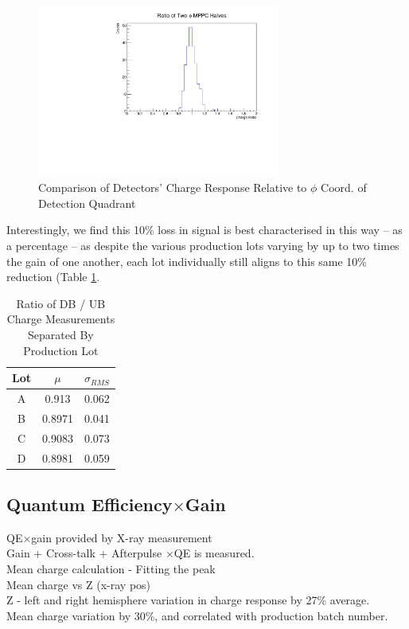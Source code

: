 \begin{figure}[H]
    \centering
    \includegraphics[width=8cm]{graphics/phihalfmppcqrationostats.pdf}
    \caption{Comparison of Detectors' Charge Response Relative to $\phi$ Coord. of Detection Quadrant}
    \label{fig:chargeratiobtwphihalves}
\end{figure}

Interestingly, we find this 10\% loss in signal is best characterised in this way -- as a percentage -- as despite the various production lots varying by up to two times the gain of one another, each lot individually still aligns to this same 10\% reduction (Table \ref{tab:lotquadqrat}.
\begin{table}[H]
    \centering
    \begin{tabular}{c||c|c}
        Lot & $\mu$ & $\sigma_{RMS}$ \\
        \hline
        A & 0.913 & 0.062 \\
        B & 0.8971 & 0.041 \\
        C & 0.9083 & 0.073 \\
        D & 0.8981 & 0.059
    \end{tabular}
    \caption{Ratio of DB / UB Charge Measurements Separated By Production Lot}
    \label{tab:lotquadqrat}
\end{table}


\subsection{Quantum Efficiency$\times$Gain} \label{QEsec}

\noindent QE$\times$gain provided by X-ray measurement \\
Gain + Cross-talk + Afterpulse $\times$QE is measured. \\
Mean charge calculation - Fitting the peak \\
Mean charge vs Z (x-ray pos) \\
Z - left and right hemisphere variation in charge response by 27\% average. \\
Mean charge variation by 30\%, and correlated with production batch number. \\



